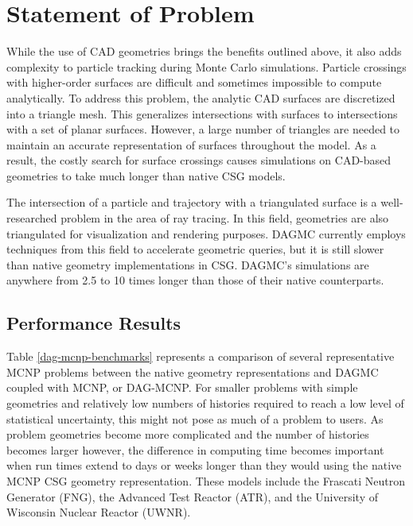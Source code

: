 \section{Statement of Problem}\label{sec:problem-statement}

While the use of CAD geometries brings the benefits outlined above, it also adds
complexity to particle tracking during Monte Carlo simulations. Particle
crossings with higher-order surfaces are difficult and sometimes impossible to
compute analytically. To address this problem, the analytic CAD surfaces are
discretized into a triangle mesh. This generalizes intersections with surfaces
to intersections with a set of planar surfaces. However, a large number of
triangles are needed to maintain an accurate representation of surfaces
throughout the model. As a result, the costly search for surface crossings
causes simulations on CAD-based geometries to take much longer than native CSG
models.

The intersection of a particle and trajectory with a triangulated surface is a
well-researched problem in the area of ray tracing. In this field, geometries
are also triangulated for visualization and rendering purposes. DAGMC currently
employs techniques from this field to accelerate geometric queries, but it is
still slower than native geometry implementations in CSG. DAGMC's simulations
are anywhere from 2.5 to 10 times longer than those of their native
counterparts.

\subsection{Performance Results}%

Table \ref{dag-mcnp-benchmarks} represents a comparison of several
representative MCNP problems between the native geometry representations and
DAGMC coupled with MCNP, or DAG-MCNP. For smaller problems with simple
geometries and relatively low numbers of histories required to reach a low level
of statistical uncertainty, this might not pose as much of a problem to
users. As problem geometries become more complicated and the number of histories
becomes larger however, the difference in computing time becomes important when
run times extend to days or weeks longer than they would using the native MCNP
CSG geometry representation. These models include the Frascati Neutron Generator
(FNG), the Advanced Test Reactor (ATR), and the University of Wisconsin Nuclear
Reactor (UWNR).


